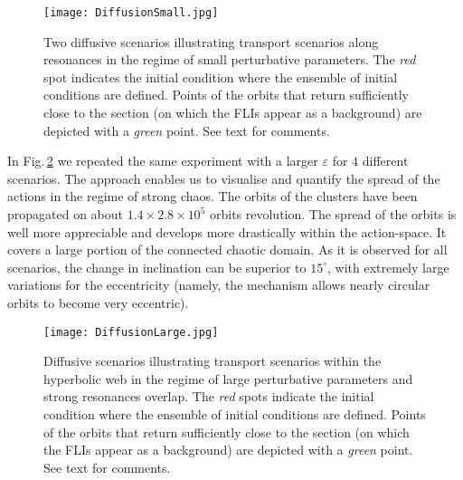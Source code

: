 \documentclass{amsart}
\theoremstyle{definition}
\theoremstyle{remark}
\numberwithin{equation}{section}
\begin{document}
\begin{figure}
\texttt{[image: DiffusionSmall.jpg]} 
\caption{\label{fig:DiffusionSmallEps} 
{\color{black}Two diffusive scenarios illustrating transport scenarios along resonances in the regime of small perturbative parameters. The {\it red} spot indicates the initial condition where the ensemble of initial conditions are defined. Points of the orbits {\color{black}that} return sufficiently close to the section (on which the FLIs appear as a background) are depicted with a {\it green} point. See text for comments.}}
\end{figure}


In Fig.\,\ref{fig:DiffusionLargeEps} {\color{black}we repeated the same experiment with a larger $\varepsilon$ for $4$ different scenarios}. The approach enables us to visualise and quantify the spread of the actions in the regime of strong chaos. The orbits of the clusters have been propagated on about  $1.4 \times 2.8 \times 10^{5}$ orbits revolution. The spread of the orbits is well more appreciable {\color{black}and develops more drastically within the action-space}. It covers a large portion of the connected chaotic domain.  As it is observed {\color{black} for all scenarios}, the change in inclination can be superior  to $15^{\circ}$, with {\color{black}extremely large} variations for the eccentricity ({\color{black}namely, the mechanism allows nearly circular orbits to become very eccentric}).   

\begin{figure}
\texttt{[image: DiffusionLarge.jpg]} 
\caption{\label{fig:DiffusionLargeEps} 
{\color{black}Diffusive scenarios illustrating transport scenarios within the hyperbolic web in the regime of large perturbative parameters and strong resonances overlap. The {\it red} spots indicate the initial condition where the ensemble of initial conditions are defined. Points of the orbits {\color{black}that} return sufficiently close to the section (on which the FLIs appear as a background) are depicted with a {\it green} point. See text for comments.}}
\end{figure}
\end{document}
